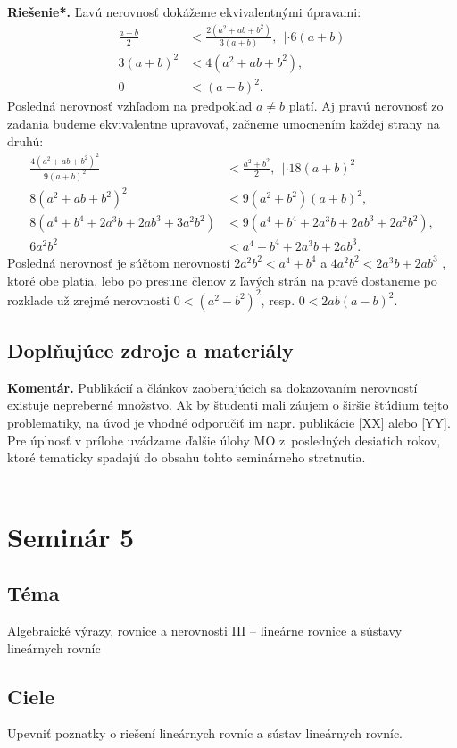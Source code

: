 \documentclass[11pt,a4paper,oneside,final]{book}
\newcommand{\kom}{\textbf{Komentár.} }
\newcommand{\rieh}{\textbf{Riešenie*.} }
\begin{document}
\rieh Ľavú nerovnosť dokážeme ekvivalentnými úpravami:
\begin{align*}
\frac{a+b}{2}&<\frac{2(a^2 + ab + b^2 )}{3(a+b)}, \ \ | \cdot 6(a+b)\\
3(a+b)^2&<4(a^2+ab+b^2),\\
0&<(a-b)^2.
\end{align*}
Posledná nerovnosť vzhľadom na predpoklad $a\neq b$ platí. Aj pravú nerovnosť zo zadania budeme ekvivalentne upravovať, začneme umocnením každej strany na druhú:
\begin{align*}
\frac{4(a^2 + ab + b^2 )^2}{9(a + b)^2}&<\frac{a^2 + b^2}{2}, \ \ | \cdot 18(a + b)^2\\
8(a^2 + ab + b^2 )^2 &< 9(a^2 + b^2 )(a + b)^2,\\
8(a^4 + b^4 + 2a^3 b + 2ab^3 + 3a^2 b^2 ) &< 9(a^4 + b^4 + 2a^3 b + 2ab^3 + 2a^2 b^2 ),\\
6a^2 b^2 &< a^4 + b^4 + 2a^3 b + 2ab^3.
\end{align*}
Posledná nerovnosť je súčtom nerovností $2a^2 b^2 < a^4 + b^4$ a $4a^2 b^2 < 2a^3 b + 2ab^3$ , ktoré
obe platia, lebo po presune členov z ľavých strán na pravé dostaneme po rozklade už zrejmé nerovnosti $0 < (a^2- b^2)^2$, resp. $0 < 2ab(a - b)^2$.

\subsection*{Doplňujúce zdroje a materiály}
\kom Publikácií a článkov zaoberajúcich sa dokazovaním nerovností existuje nepreberné množstvo. Ak by študenti mali záujem o širšie štúdium tejto problematiky, na úvod je vhodné odporučiť im napr. publikácie [XX] alebo [YY]. Pre úplnosť v prílohe uvádzame ďalšie úlohy MO z~posledných desiatich rokov, ktoré tematicky spadajú do obsahu tohto seminárneho stretnutia. \\
\\

\newpage
\section*{Seminár 5}
\subsection*{Téma}
Algebraické výrazy, rovnice a nerovnosti III -- lineárne rovnice a sústavy lineárnych rovníc

\subsection*{Ciele}
Upevniť poznatky o riešení lineárnych rovníc a sústav lineárnych rovníc.
\end{document}
